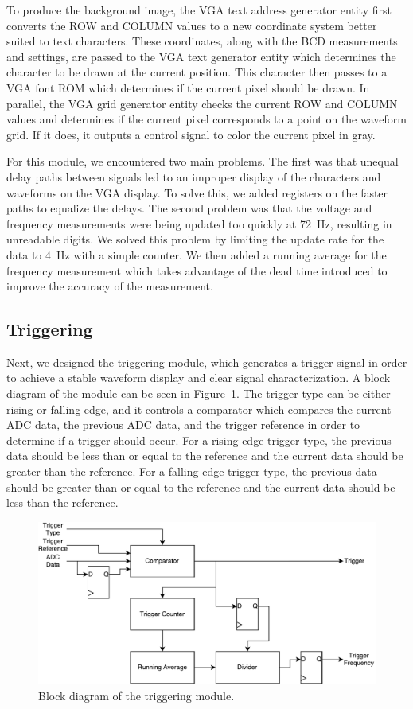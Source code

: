 \documentclass[journal,hidelinks]{IEEEtran}
\begin{document}
To produce the background image, the VGA text address generator entity first converts the ROW and COLUMN values to a new coordinate system better suited to text characters. These coordinates, along with the BCD measurements and settings, are passed to the VGA text generator entity which determines the character to be drawn at the current position. This character then passes to a VGA font ROM which determines if the current pixel should be drawn.
In parallel, the VGA grid generator entity checks the current ROW and COLUMN values and determines if the current pixel corresponds to a point on the waveform grid. If it does, it outputs a control signal to color the current pixel in gray.

For this module, we encountered two main problems. The first was that unequal delay paths between signals led to an improper display of the characters and waveforms on the VGA display. To solve this, we added registers on the faster paths to equalize the delays. The second problem was that the voltage and frequency measurements were being updated too quickly at 72~Hz, resulting in unreadable digits. We solved this problem by limiting the update rate for the data to 4~Hz with a simple counter. We then added a running average for the frequency measurement which takes advantage of the dead time introduced to improve the accuracy of the measurement.

\subsection{Triggering}

Next, we designed the triggering module, which generates a trigger signal in order to achieve a stable waveform display and clear signal characterization. A block diagram of the module can be seen in Figure~\ref{fig:triggering}. The trigger type can be either rising or falling edge, and it controls a comparator which compares the current ADC data, the previous ADC data, and the trigger reference in order to determine if a trigger should occur. For a rising edge trigger type, the previous data should be less than or equal to the reference and the current data should be greater than the reference. For a falling edge trigger type, the previous data should be greater than or equal to the reference and the current data should be less than the reference.

\begin{figure}[!htb]
  \centering
  \includegraphics[width=\columnwidth]{diagrams/triggering.pdf}
  \caption{Block diagram of the triggering module.}
  \label{fig:triggering}
\end{figure}
\end{document}
